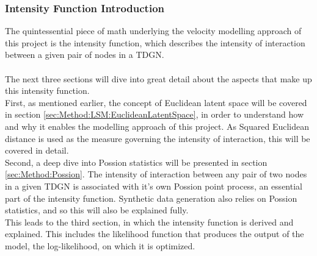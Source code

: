 \subsubsection{Intensity Function Introduction}
\label{sec:Method:VModel:IntensityFuncIntro}
The quintessential piece of math underlying the velocity modelling approach of this project is the intensity function, which describes the intensity of interaction between a given pair of nodes in a TDGN.
\\\\
The next three sections will dive into great detail about the aspects that make up this intensity function.
\\
First, as mentioned earlier, the concept of Euclidean latent space will be covered in section \ref{sec:Method:LSM:EuclideanLatentSpace}, in order to understand how and why it enables the modelling approach of this project. 
As Squared Euclidean distance is used as the measure governing the intensity of interaction, this will be covered in detail.
\\
Second, a deep dive into Possion statistics will be presented in section \ref{sec:Method:Possion}.
The intensity of interaction between any pair of two nodes in a given TDGN is associated with it's own Possion point process, an essential part of the intensity function.
Synthetic data generation also relies on Possion statistics, and so this will also be explained fully.
\\
This leads to the third section, in which the intensity function is derived and explained. 
This includes the likelihood function that produces the output of the model, the log-likelihood, on which it is optimized.









